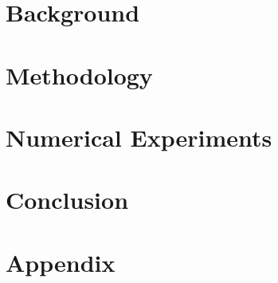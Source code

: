 \documentclass{article}
\begin{document}
\section{Background}
\label{sec:background}

\section{Methodology}
\label{sec:methodology}

\section{Numerical Experiments}
\label{sec:numerical_experiments}

\section{Conclusion}
\label{sec:conclusion}




\appendix
\section{Appendix}
\label{sec:appendix}
\end{document}
